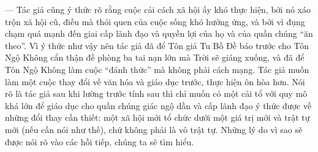 — Tác giả cũng ý thức rõ rằng cuộc cải cách xã hội ấy khó thực hiện, bởi nó xáo trộn xã hội cũ, điều mà thói quen của cuộc sống khó hưởng ứng, và bởi vì đụng chạm quá mạnh đến giai cấp lãnh đạo và quyền lợi của họ và của quần chúng ``ăn theo''. Vì ý thức như vậy nên tác giả đã để Tôn giả Tu Bồ Đề báo trước cho Tôn Ngộ Không cẩn thận đề phòng ba tai nạn lớn mà Trời sẽ giáng xuống, và đã để Tôn Ngộ Không làm cuộc ``đánh thức'' mà không phải cách mạng. Tác giả muốn làm một cuộc thay đổi về văn hóa và giáo dục trước, thực hiện ôn hòa hơn. Nói rõ là tác giả sau khi lường trước tính sau thì chỉ muốn có một cải tổ với quy mô khá lớn để giáo dục cho quần chúng giác ngộ dần và cấp lãnh đạo ý thức được về những đổi thay cần thiết: một xã hội mới tổ chức dưới một giá trị mới và trật tự mới (nếu cần nói như thế), chứ không phải là vô trật tự. Những lý do vì sao sẽ được nói rõ vào các hồi tiếp, chúng ta sẽ tìm hiểu.

